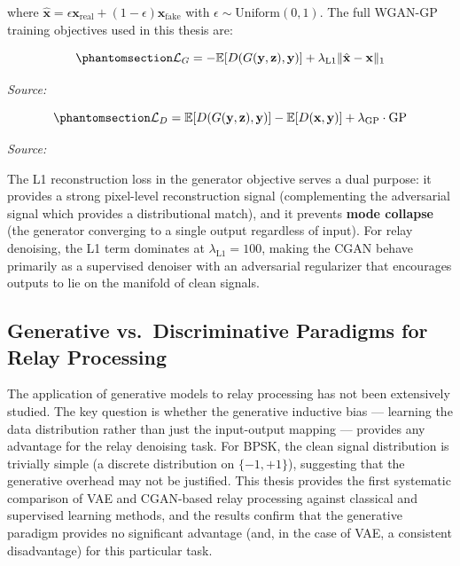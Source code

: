 where \(\hat{\mathbf{x}} = \epsilon \mathbf{x}_{\text{real}} + (1-\epsilon) \mathbf{x}_{\text{fake}}\) with \(\epsilon \sim \text{Uniform}(0, 1)\). The full WGAN-GP training objectives used in this thesis are:

\begin{equation}\protect\phantomsection\label{eq:wgan-gen-loss}{\mathcal{L}_G = -\mathbb{E}[D(G(\mathbf{y}, \mathbf{z}), \mathbf{y})] + \lambda_{\text{L1}} \|\hat{\mathbf{x}} - \mathbf{x}\|_1
}\end{equation} \par{\small\textit{Source: \cite{gulrajani2017improved}}}

\begin{equation}\protect\phantomsection\label{eq:wgan-disc-loss}{\mathcal{L}_D = \mathbb{E}[D(G(\mathbf{y}, \mathbf{z}), \mathbf{y})] - \mathbb{E}[D(\mathbf{x}, \mathbf{y})] + \lambda_{\text{GP}} \cdot \text{GP}
}\end{equation} \par{\small\textit{Source: \cite{gulrajani2017improved}}}

The L1 reconstruction loss in the generator objective serves a dual purpose: it provides a strong pixel-level reconstruction signal (complementing the adversarial signal which provides a distributional match), and it prevents \textbf{mode collapse} (the generator converging to a single output regardless of input). For relay denoising, the L1 term dominates at \(\lambda_{\text{L1}} = 100\), making the CGAN behave primarily as a supervised denoiser with an adversarial regularizer that encourages outputs to lie on the manifold of clean signals.

\subsection{Generative vs.~Discriminative Paradigms for Relay Processing}\label{sec:generative-vs.-discriminative-paradigms-for-relay-processing}

The application of generative models to relay processing has not been extensively studied. The key question is whether the generative inductive bias --- learning the data distribution rather than just the input-output mapping --- provides any advantage for the relay denoising task. For BPSK, the clean signal distribution is trivially simple (a discrete distribution on \(\{-1, +1\}\)), suggesting that the generative overhead may not be justified. This thesis provides the first systematic comparison of VAE and CGAN-based relay processing against classical and supervised learning methods, and the results confirm that the generative paradigm provides no significant advantage (and, in the case of VAE, a consistent disadvantage) for this particular task.

